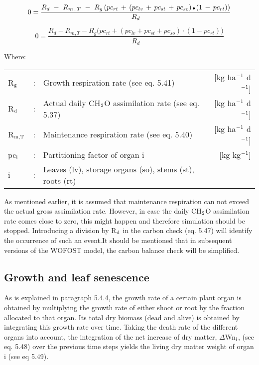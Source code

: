 \begin{equation}
0 = {\frac{R _{d} ~-~ R _{m\, ,\, T} ~-~ R _{g} \, (pc _{rt} \, +\, (pc _{lv} \, +\, pc _{st} \, +\, pc _{so} )\, {\rm \Bullet{0.75ex}}\, (1\, -\, pc _{rt} ))}{R_{d}}}  
\end{equation}

\begin{equation}
0 = {\frac{R_{d} - R_{m,T} - R_{g} \big( pc_{rt} + (pc_{lv} + pc_{st} + pc_{so}) \cdot (1 - pc_{rt}) \big) }{R_d}}  
\end{equation}

Where:\\[5pt]
\begin{tabularx}{\textwidth}{llXr}
R$_{{\rm g}}$ &:& Growth respiration rate (see eq. 5.41)   &
     [kg ha$^{{\rm -1}}$ d$^{{\rm -1}}$]\\
R$_{{\rm d}}$ &:& Actual daily CH$_{{\rm 2}}$O assimilation rate (see eq. 5.37)   &
     [kg ha$^{{\rm -1}}$ d$^{{\rm -1}}$]\\
R$_{{\rm m,T}}$ &:& Maintenance respiration rate (see eq. 5.40)   &
     [kg ha$^{{\rm -1}}$ d$^{{\rm -1}}$]\\
pc$_{{\rm i}}$ &:& Partitioning factor of organ i    &
     [kg kg$^{{\rm -1}}$]\\
i &:& Leaves (lv), storage organs (so), stems (st), roots (rt)\\
\end{tabularx}

As mentioned earlier, it is assumed that maintenance respiration can not exceed the actual
gross assimilation rate. However, in case the daily CH$_{{\rm 2}}$O assimilation rate comes close to
zero, this might happen and therefore simulation should be stopped. Introducing a
division by R$_{{\rm d}}$ in the carbon check (eq. 5.47) will identify the occurrence of such an
event.It should be mentioned that in subsequent versions of the WOFOST model, the carbon
balance check will be simplified.

\subsection{Growth and leaf senescence  }

As is explained in paragraph 5.4.4, the growth rate of a certain plant organ is obtained by
multiplying the growth rate of either shoot or root by the fraction allocated to that organ.
Its total dry biomass (dead and alive) is obtained by integrating this growth rate over
time. Taking the death rate of the different organs into account, the integration of the net
increase of dry matter, $\Delta$Wn$_{{\rm i}}$, (see eq. 5.48) over the previous time steps 
yields the living dry matter weight of organ i (see eq 5.49).

